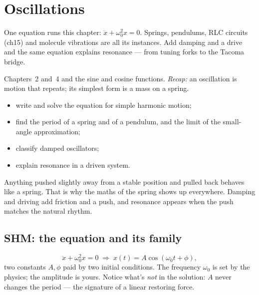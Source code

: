 \chapter{Oscillations}\label{ch:osc}

One equation runs this chapter: $\ddot x+\omega_0^{2}x=0$. Springs,
pendulums, RLC circuits (ch15) and molecule vibrations are all its
instances. Add damping and a drive and the same equation explains resonance
--- from tuning forks to the Tacoma bridge.

\begin{rulebox}
Chapters~2 and~4 and the sine and cosine functions. \emph{Recap:} an oscillation is motion that repeats; its simplest form is a mass on a spring.
\end{rulebox}
\begin{wins}
\begin{itemize}
\item write and solve the equation for simple harmonic motion;
\item find the period of a spring and of a pendulum, and the limit of the small-angle approximation;
\item classify damped oscillators;
\item explain resonance in a driven system.
\end{itemize}
\end{wins}
\begin{principle}
Anything pushed slightly away from a stable position and pulled back behaves like a spring. That is why the maths of the spring shows up everywhere. Damping and driving add friction and a push, and resonance appears when the push matches the natural rhythm.
\end{principle}

\section{SHM: the equation and its family}\label{sec:osc-shm}

\begin{equation}
  \ddot x+\omega_0^{2}x=0\;\Rightarrow\;
  x(t)=A\cos(\omega_0t+\phi),\label{eq:shm}
\end{equation}
two constants $A,\phi$ paid by two initial conditions. The frequency
$\omega_0$ is set by the physics; the amplitude is yours. Notice what's
\emph{not} in the solution: $A$ never changes the period --- the signature
of a linear restoring force.

